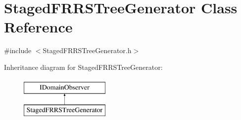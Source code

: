 \hypertarget{class_staged_f_r_r_s_tree_generator}{}\section{Staged\+F\+R\+R\+S\+Tree\+Generator Class Reference}
\label{class_staged_f_r_r_s_tree_generator}


{\ttfamily \#include $<$Staged\+F\+R\+R\+S\+Tree\+Generator.\+h$>$}

Inheritance diagram for Staged\+F\+R\+R\+S\+Tree\+Generator\+:\begin{figure}[H]
\begin{center}
\leavevmode
\includegraphics[height=2.000000cm]{d3/de1/class_staged_f_r_r_s_tree_generator}
\end{center}
\end{figure}
